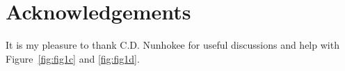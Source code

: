 {\section{Acknowledgements}

It is my pleasure to thank C.D. Nunhokee for useful discussions and help with Figure~\ref{fig:fig1c} and \ref{fig:fig1d}.


%
}
